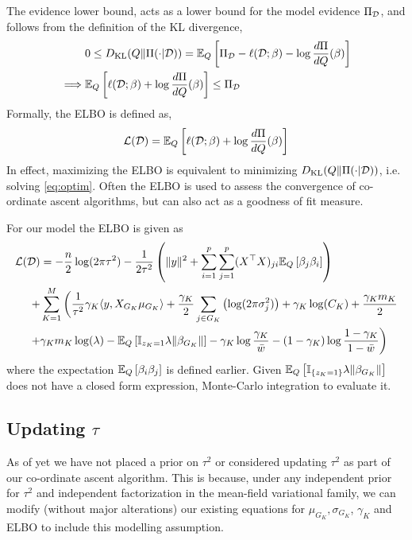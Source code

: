 \documentclass[12pt]{article}
\begin{document}
The evidence lower bound, acts as a lower bound for the model evidence $\Pi_{\mathcal{D}}$, and follows from the definition of the KL divergence,
\begin{align*}
 & 0 \leq D_\text{KL}(Q \| \Pi(\cdot | \mathcal{D})) = \mathbb{E}_Q \left[ \Pi_{\mathcal{D}} - \ell(\mathcal{D}; \beta) - \log \frac{d\Pi}{dQ} (\beta) \right] \\
    \implies & \mathbb{E}_Q \left[ \ell(\mathcal{D}; \beta) + \log \frac{d\Pi}{dQ} (\beta) \right] \leq \Pi_{\mathcal{D}}
\end{align*}
Formally, the ELBO is defined as,
\begin{equation}
   \mathcal{L}(\mathcal{D}) = \mathbb{E}_Q \left[ \ell(\mathcal{D}; \beta) + \log \frac{d\Pi}{dQ}(\beta) \right]
\end{equation}
In effect, maximizing the ELBO is equivalent to minimizing $D_\text{KL}(Q \| \Pi(\cdot | \mathcal{D})) $, i.e. solving \eqref{eq:optim}. Often the ELBO is used to assess the convergence of co-ordinate ascent algorithms, but can also act as a goodness of fit measure.

For our model the ELBO is given as
\begin{equation} \label{eq:elbo} 
\begin{aligned}
    \mathcal{L}(\mathcal{D}) &= 
- 
    \frac{n}{2} \log(2 \pi \tau^2) 
- 
    \frac{1}{2\tau^2} \left( \| y \|^2  + \sum_{i=1}^p \sum_{j=1}^p (X^\top X)_{ji} \mathbb{E}_Q \left[ \beta_j \beta_i \right] \right)\\
+& 
    \sum_{K=1}^M \bigg(  
\frac{1}{\tau^2} \gamma_K \langle y, X_{G_K} \mu_{G_K} \rangle
+
    \frac{\gamma_K}{2} \sum_{j \in G_K} \left( \log( 2 \pi \sigma_j^2) \right)
+
    \gamma_K \log(C_K)
+ 
    \frac{\gamma_K m_K}{2} \\
+ &
    \gamma_K m_K \log (\lambda)
-
    \mathbb{E}_Q \left[ \mathbb{I}_{z_K =1} \lambda \| \beta_{G_K} \| \right]
-
    \gamma_K \log \frac{\gamma_K}{\bar{w}}
-
    (1-\gamma_K) \log \frac{1 - \gamma_K}{1 - \bar{w}}
\bigg)
\end{aligned}
\end{equation}
where the expectation $\mathbb{E}_Q \left[ \beta_i \beta_j \right]$ is defined earlier. Given $\mathbb{E}_Q \left[ \mathbb{I}_{\{z_K = 1\}} \lambda \| \beta_{G_K} \| \right] $ does not have a closed form expression, Monte-Carlo integration to evaluate it.

\subsection{Updating $\tau$}

As of yet we have not placed a prior on $\tau^2$ or considered updating $\tau^2$ as part of our co-ordinate ascent algorithm. This is because, under any independent prior for $\tau^2$ and independent factorization in the mean-field variational family, we can modify (without major alterations) our existing equations for $\mu_{G_K}, \sigma_{G_K}$, $\gamma_K$ and ELBO to include this modelling assumption.
\end{document}
